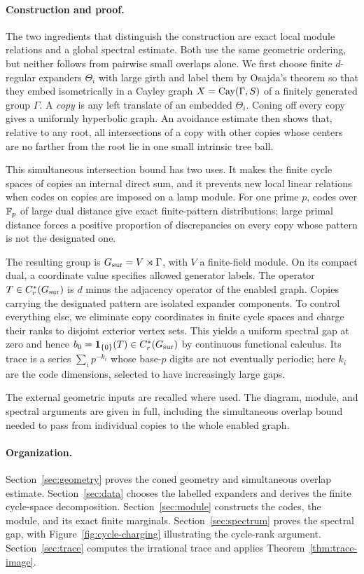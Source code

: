 \paragraph{Construction and proof.}
The two ingredients that distinguish the construction are exact local
module relations and a global spectral estimate. Both use the same
geometric ordering, but neither follows from pairwise small overlaps
alone.
We first choose finite \(d\)-regular expanders \(\Theta_i\) with large girth and
label them by Osajda's theorem so that they embed isometrically in a Cayley
graph \(X=\operatorname{Cay}(\Gamma,S)\) of a finitely generated group \(\Gamma\). A \emph{copy} is any left translate of an embedded
\(\Theta_i\). Coning off every copy gives a uniformly hyperbolic graph.
An avoidance estimate then shows that, relative to any root, all
intersections of a copy with other copies whose centers are no farther from
the root lie in one small intrinsic tree ball.

This simultaneous intersection bound has two uses. It makes the finite
cycle spaces of copies an internal direct sum, and it prevents new local
linear relations when codes on copies are imposed on a lamp module.
For one prime \(p\), codes over \(\mathbb F_p\) of large dual distance give
exact finite-pattern distributions;
large primal distance forces a positive proportion of discrepancies on
every copy whose pattern is not the designated one.

The resulting group is \(G_{\mathrm{sur}}=V\rtimes\Gamma\), with \(V\) a finite-field
module. On its compact dual, a coordinate value specifies allowed
generator labels. The operator \(T\in C_r^*(G_{\mathrm{sur}})\) is \(d\) minus the
adjacency operator of the enabled graph. Copies carrying the designated
pattern are isolated expander components. To control everything else, we
eliminate copy coordinates in finite cycle spaces and charge their ranks
to disjoint exterior vertex sets. This yields a uniform spectral gap at
zero and hence \(b_0=\mathbf 1_{\{0\}}(T)\in C_r^*(G_{\mathrm{sur}})\) by continuous
functional calculus. Its trace is a series \(\sum_i p^{-k_i}\) whose
base-\(p\) digits are not eventually periodic; here \(k_i\) are the
code dimensions, selected to have increasingly large gaps.

The external geometric inputs are recalled where used. The diagram,
module, and spectral arguments are given in full, including the
simultaneous overlap bound needed to pass from individual copies to the
whole enabled graph.

\paragraph{Organization.}
Section~\ref{sec:geometry} proves the coned geometry and simultaneous
overlap estimate. Section~\ref{sec:data} chooses the labelled expanders
and derives the finite cycle-space decomposition.
Section~\ref{sec:module} constructs the codes, the module, and its exact
finite marginals. Section~\ref{sec:spectrum} proves the spectral gap,
with Figure~\ref{fig:cycle-charging} illustrating the cycle-rank argument.
Section~\ref{sec:trace} computes the irrational trace and applies
Theorem~\ref{thm:trace-image}.
